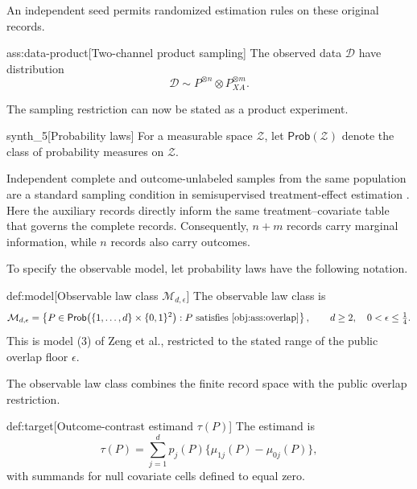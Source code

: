 An independent seed  permits randomized estimation rules on these original records.

\begin{assumptionv}{ass:data-product}[Two-channel product sampling]
The observed data \(\mathcal D\) have distribution
\[
\mathcal D\sim P^{\otimes n}\otimes P_{XA}^{\otimes m}.
\]
\end{assumptionv}

The sampling restriction can now be stated as a product experiment.

\begin{definitionv}{synth_5}[Probability laws]
For a measurable space \(\mathcal Z\), let \(\mathsf{Prob}(\mathcal Z)\) denote the class of probability measures on \(\mathcal Z\).
\end{definitionv}

Independent complete and outcome-unlabeled samples from the same population are a standard sampling condition in semisupervised treatment-effect estimation \citep[Assumptions 2.1--2.2]{ChakraborttyDai2024Semisupervised}. Here the auxiliary records directly inform the same treatment--covariate table that governs the complete records. Consequently, \(n+m\) records carry marginal information, while \(n\) records also carry outcomes.

To specify the observable model, let probability laws have the following notation.

\begin{definitionv}{def:model}[Observable law class \(\mathcal M_{d,\epsilon}\)]
The observable law class is
\[
\mathcal M_{d,\epsilon}
=
\left\{
P\in\mathsf{Prob}\bigl(\{1,\ldots,d\}\times\{0,1\}^2\bigr):
P\text{ satisfies }\cref{obj:ass:overlap}
\right\},
\qquad d\ge2,\quad 0<\epsilon\le\tfrac14.
\]
This is model (3) of Zeng et al., restricted to the stated range of the public overlap floor \(\epsilon\).
\end{definitionv}

The observable law class  combines the finite record space with the public overlap restriction.

\begin{definitionv}{def:target}[Outcome-contrast estimand \(\tau(P)\)]
The estimand is
\[
\tau(P)
=
\sum_{j=1}^{d}p_j(P)\{\mu_{1j}(P)-\mu_{0j}(P)\},
\]
with summands for null covariate cells defined to equal zero.
\end{definitionv}

